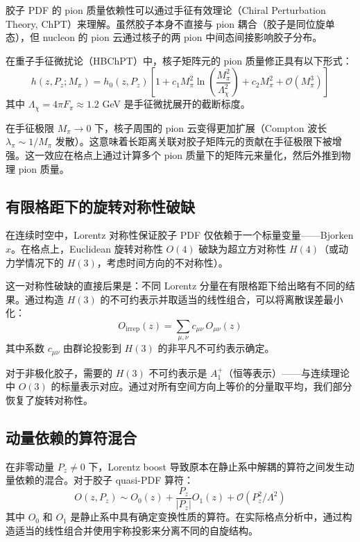 \documentclass[11pt,a4paper]{ctexart}
\newcommand{\order}[1]{\mathcal{O}(#1)}
\begin{document}
胶子 PDF 的 pion 质量依赖性可以通过手征有效理论（Chiral Perturbation Theory, ChPT）来理解。虽然胶子本身不直接与 pion 耦合（胶子是同位旋单态），但 nucleon 的 pion 云通过核子的两 pion 中间态间接影响胶子分布。

在重子手征微扰论（HBChPT）中，核子矩阵元的 pion 质量修正具有以下形式：
\begin{equation}
h(z, P_z; M_\pi) = h_0(z, P_z) \left[ 1 + c_1 M_\pi^2 \ln\!\left( \frac{M_\pi^2}{\Lambda_\chi^2} \right) + c_2 M_\pi^2 + \order{M_\pi^3} \right]
\end{equation}
其中 $\Lambda_\chi = 4\pi F_\pi \approx 1.2$ GeV 是手征微扰展开的截断标度。

在手征极限 $M_\pi \to 0$ 下，核子周围的 pion 云变得更加扩展（Compton 波长 $\lambda_\pi \sim 1/M_\pi$ 发散）。这意味着长距离关联对胶子矩阵元的贡献在手征极限下被增强。这一效应在格点上通过计算多个 pion 质量下的矩阵元来量化，然后外推到物理 pion 质量。

\subsection{有限格距下的旋转对称性破缺}

在连续时空中，Lorentz 对称性保证胶子 PDF 仅依赖于一个标量变量——Bjorken $x$。在格点上，Euclidean 旋转对称性 $O(4)$ 破缺为超立方对称性 $H(4)$（或动力学情况下的 $H(3)$，考虑时间方向的不对称性）。

这一对称性破缺的直接后果是：不同 Lorentz 分量在有限格距下给出略有不同的结果。通过构造 $H(3)$ 的不可约表示并取适当的线性组合，可以将离散误差最小化：
\begin{equation}
O_{\text{irrep}}(z) = \sum_{\mu,\nu} c_{\mu\nu} \, O_{\mu\nu}(z)
\end{equation}
其中系数 $c_{\mu\nu}$ 由群论投影到 $H(3)$ 的非平凡不可约表示确定。

对于非极化胶子，需要的 $H(3)$ 不可约表示是 $A_1^+$（恒等表示）——与连续理论中 $O(3)$ 的标量表示对应。通过对所有空间方向上等价的分量取平均，我们部分恢复了旋转对称性。

\subsection{动量依赖的算符混合}

在非零动量 $P_z \neq 0$ 下，Lorentz boost 导致原本在静止系中解耦的算符之间发生动量依赖的混合。对于胶子 quasi-PDF 算符：
\begin{equation}
O(z, P_z) \sim O_0(z) + \frac{P_z}{|P_z|} O_1(z) + \order{P_z^2/\Lambda^2}
\end{equation}
其中 $O_0$ 和 $O_1$ 是静止系中具有确定变换性质的算符。在实际格点分析中，通过构造适当的线性组合并使用宇称投影来分离不同的自旋结构。
\end{document}
